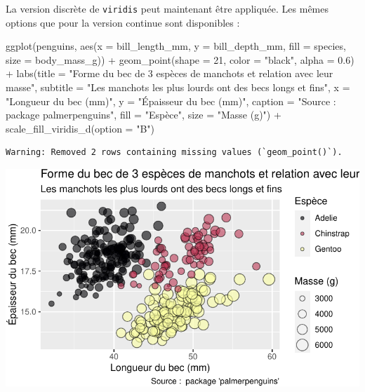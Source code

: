 \documentclass[
  a4paper,
  DIV=11,
  numbers=noendperiod,
  oneside]{scrreprt}
\newenvironment{Shaded}{}{}
\newcommand{\AttributeTok}[1]{\textcolor[rgb]{0.84,0.23,0.29}{#1}}
\newcommand{\DecValTok}[1]{\textcolor[rgb]{0.00,0.36,0.77}{#1}}
\newcommand{\FloatTok}[1]{\textcolor[rgb]{0.00,0.36,0.77}{#1}}
\newcommand{\FunctionTok}[1]{\textcolor[rgb]{0.44,0.26,0.76}{#1}}
\newcommand{\NormalTok}[1]{\textcolor[rgb]{0.14,0.16,0.18}{#1}}
\newcommand{\SpecialCharTok}[1]{\textcolor[rgb]{0.00,0.36,0.77}{#1}}
\newcommand{\StringTok}[1]{\textcolor[rgb]{0.01,0.18,0.38}{#1}}
\begin{document}
La version discrète de \texttt{viridis} peut maintenant être appliquée.
Les mêmes options que pour la version continue sont disponibles :

\begin{Shaded}
\begin{Highlighting}[]
\FunctionTok{ggplot}\NormalTok{(penguins, }\FunctionTok{aes}\NormalTok{(}\AttributeTok{x =}\NormalTok{ bill\_length\_mm, }\AttributeTok{y =}\NormalTok{ bill\_depth\_mm,}
                     \AttributeTok{fill =}\NormalTok{ species, }\AttributeTok{size =}\NormalTok{ body\_mass\_g)) }\SpecialCharTok{+}
  \FunctionTok{geom\_point}\NormalTok{(}\AttributeTok{shape =} \DecValTok{21}\NormalTok{, }\AttributeTok{color =} \StringTok{"black"}\NormalTok{, }\AttributeTok{alpha =} \FloatTok{0.6}\NormalTok{) }\SpecialCharTok{+}
  \FunctionTok{labs}\NormalTok{(}\AttributeTok{title =} \StringTok{"Forme du bec de 3 espèces de manchots et relation avec leur masse"}\NormalTok{,}
       \AttributeTok{subtitle =} \StringTok{"Les manchots les plus lourds ont des becs longs et fins"}\NormalTok{,}
       \AttributeTok{x =} \StringTok{"Longueur du bec (mm)"}\NormalTok{,}
       \AttributeTok{y =} \StringTok{"Épaisseur du bec (mm)"}\NormalTok{,}
       \AttributeTok{caption =} \StringTok{"Source :  package \textquotesingle{}palmerpenguins\textquotesingle{}"}\NormalTok{,}
       \AttributeTok{fill =} \StringTok{"Espèce"}\NormalTok{,}
       \AttributeTok{size =} \StringTok{"Masse (g)"}\NormalTok{) }\SpecialCharTok{+}
  \FunctionTok{scale\_fill\_viridis\_d}\NormalTok{(}\AttributeTok{option =} \StringTok{"B"}\NormalTok{)}
\end{Highlighting}
\end{Shaded}

\begin{verbatim}
Warning: Removed 2 rows containing missing values (`geom_point()`).
\end{verbatim}

\includegraphics{03-visualization_files/figure-pdf/unnamed-chunk-99-1.pdf}
\end{document}
